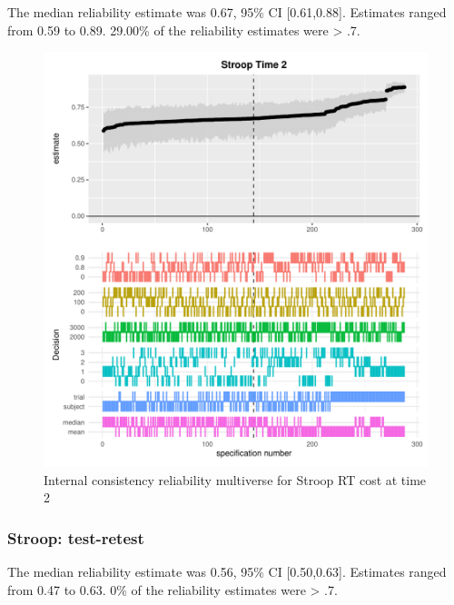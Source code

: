 \documentclass[english,man,floatsintext]{apa6}
\begin{document}
The median reliability estimate was 0.67, 95\% CI {[}0.61,0.88{]}. Estimates ranged from 0.59 to 0.89. 29.00\% of the reliability estimates were \textgreater{} .7.

\begin{figure}
\centering
\includegraphics{Reliability_Multiverse_files/figure-latex/unnamed-chunk-6-1.pdf}
\caption{\label{fig:unnamed-chunk-6}Internal consistency reliability multiverse for Stroop RT cost at time 2}
\end{figure}

\newpage

\hypertarget{stroop-test-retest}{%
\subsubsection{Stroop: test-retest}\label{stroop-test-retest}}

The median reliability estimate was 0.56, 95\% CI {[}0.50,0.63{]}. Estimates ranged from 0.47 to 0.63. 0\% of the reliability estimates were \textgreater{} .7.
\end{document}
